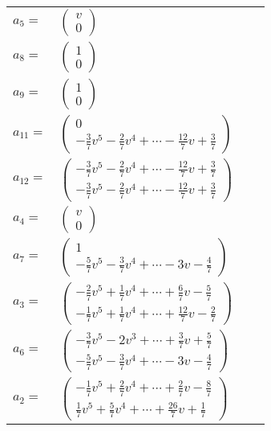 \documentclass[1p]{elsarticle_modified}
\theoremstyle{definition}
\begin{document}
\begin{tabular}{m{7pt} m{180pt} m{7pt} m{180pt} }
\flushright $a_{5}=$&$\begin{pmatrix}v\\0\end{pmatrix}$ \\
\flushright $a_{8}=$&$\begin{pmatrix}1\\0\end{pmatrix}$ \\
\flushright $a_{9}=$&$\begin{pmatrix}1\\0\end{pmatrix}$ \\
\flushright $a_{11}=$&$\begin{pmatrix}0\\-\frac{3}{7} v^5-\frac{2}{7} v^4+\cdots-\frac{12}{7} v+\frac{3}{7}\end{pmatrix}$ \\
\flushright $a_{12}=$&$\begin{pmatrix}-\frac{3}{7} v^5-\frac{2}{7} v^4+\cdots-\frac{12}{7} v+\frac{3}{7}\\-\frac{3}{7} v^5-\frac{2}{7} v^4+\cdots-\frac{12}{7} v+\frac{3}{7}\end{pmatrix}$ \\
\flushright $a_{4}=$&$\begin{pmatrix}v\\0\end{pmatrix}$ \\
\flushright $a_{7}=$&$\begin{pmatrix}1\\-\frac{5}{7} v^5-\frac{3}{7} v^4+\cdots-3 v-\frac{4}{7}\end{pmatrix}$ \\
\flushright $a_{3}=$&$\begin{pmatrix}-\frac{2}{7} v^5+\frac{1}{7} v^4+\cdots+\frac{6}{7} v-\frac{5}{7}\\-\frac{1}{7} v^5+\frac{1}{7} v^4+\cdots+\frac{12}{7} v-\frac{2}{7}\end{pmatrix}$ \\
\flushright $a_{6}=$&$\begin{pmatrix}-\frac{3}{7} v^5-2 v^3+\cdots+\frac{3}{7} v+\frac{5}{7}\\-\frac{5}{7} v^5-\frac{3}{7} v^4+\cdots-3 v-\frac{4}{7}\end{pmatrix}$ \\
\flushright $a_{2}=$&$\begin{pmatrix}-\frac{1}{7} v^5+\frac{2}{7} v^4+\cdots+\frac{2}{7} v-\frac{8}{7}\\\frac{1}{7} v^5+\frac{5}{7} v^4+\cdots+\frac{26}{7} v+\frac{1}{7}\end{pmatrix}$ \\

\end{tabular}
\end{document}
